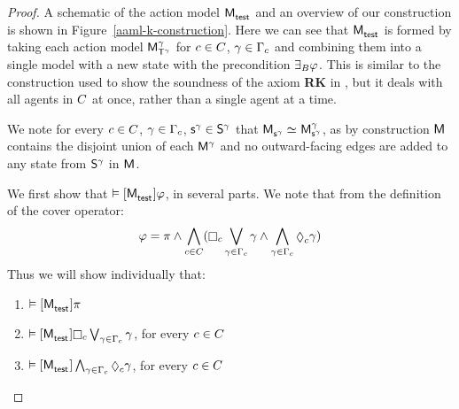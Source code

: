 \begin{proof}
A schematic of the action model $\aPModel{\aStateTest}$ and an overview of our construction is shown in Figure~\ref{aaml-k-construction}.
Here we can see that $\aPModel{\aStateTest}$ is formed by taking each action model $\aPModel[\gamma]{\aStatesT[\gamma]}$ for $\agentC \in \agentsC$, $\gamma \in \Gamma_\agentC$ and combining them into a single model with a new state with the precondition $\someactsBs \phi$.
This is similar to the construction used to show the soundness of the axiom {\bf RK} in \logicRmlK{}, but it deals with all agents in $\agentsC$ at once, rather than a single agent at a time.

We note for every $\agentC \in \agentsC$, $\gamma \in \Gamma_\agentC$, $\aStateS[\gamma] \in \aStates[\gamma]$ that $\aPModel{\aStateS[\gamma]} \bisimilar \aPModel[\gamma]{\aStateS[\gamma]}$, as by construction $\aModel$ contains the disjoint union of each $\aModel[\gamma]$ and no outward-facing edges are added to any state from $\aStates[\gamma]$ in $\aModel$.

We first show that $\entails \actionA{\aPModel{\aStateTest}} \phi$, in several parts.
We note that from the definition of the cover operator:
$$
\phi = \pi \land \bigwedge_{\agentC \in \agentsC} (\necessaryC \bigvee_{\gamma \in \Gamma_\agentC} \gamma \land \bigwedge_{\gamma \in \Gamma_\agentC} \possibleC \gamma)
$$
Thus we will show individually that:
\begin{enumerate}
\item $\entails \actionA{\aPModel{\aStateTest}} \pi$
\item $\entails \actionA{\aPModel{\aStateTest}} \necessaryC \bigvee_{\gamma \in \Gamma_\agentC} \gamma$, for every $\agentC \in \agentsC$
\item $\entails \actionA{\aPModel{\aStateTest}} \bigwedge_{\gamma \in \Gamma_\agentC} \possibleC \gamma$, for every $\agentC \in \agentsC$
\end{enumerate}


\end{proof}
